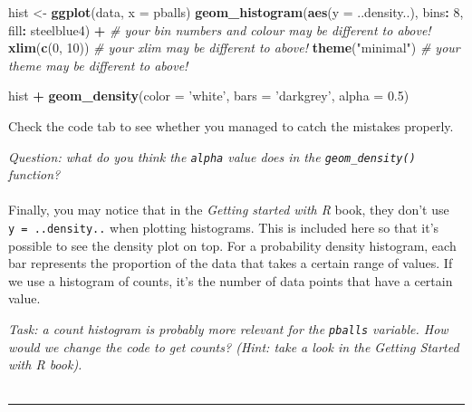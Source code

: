 \documentclass[
]{book}
\newenvironment{Shaded}{\begin{snugshade}}{\end{snugshade}}
\newcommand{\CommentTok}[1]{\textcolor[rgb]{0.56,0.35,0.01}{\textit{#1}}}
\newcommand{\DataTypeTok}[1]{\textcolor[rgb]{0.13,0.29,0.53}{#1}}
\newcommand{\DecValTok}[1]{\textcolor[rgb]{0.00,0.00,0.81}{#1}}
\newcommand{\FloatTok}[1]{\textcolor[rgb]{0.00,0.00,0.81}{#1}}
\newcommand{\KeywordTok}[1]{\textcolor[rgb]{0.13,0.29,0.53}{\textbf{#1}}}
\newcommand{\NormalTok}[1]{#1}
\newcommand{\OperatorTok}[1]{\textcolor[rgb]{0.81,0.36,0.00}{\textbf{#1}}}
\newcommand{\StringTok}[1]{\textcolor[rgb]{0.31,0.60,0.02}{#1}}
\begin{document}
\begin{Shaded}
\begin{Highlighting}[]
\NormalTok{hist <-}\StringTok{ }\KeywordTok{ggplot}\NormalTok{(data, }\DataTypeTok{x =}\NormalTok{ pballs)}
    \KeywordTok{geom_histogram}\NormalTok{(}\KeywordTok{aes}\NormalTok{(}\DataTypeTok{y =}\NormalTok{ ..density..), bins}\OperatorTok{:}\StringTok{ }\DecValTok{8}\NormalTok{, fill}\OperatorTok{:}\StringTok{ }\NormalTok{steelblue4) }\OperatorTok{+}\StringTok{ }
\StringTok{    }\CommentTok{# your bin numbers and colour may be different to above!}
\StringTok{    }\KeywordTok{xlim}\NormalTok{(}\KeywordTok{c}\NormalTok{(}\DecValTok{0}\NormalTok{, }\DecValTok{10}\NormalTok{))}
    \CommentTok{# your xlim may be different to above!}
    \KeywordTok{theme}\NormalTok{(}\StringTok{"minimal"}\NormalTok{)}
    \CommentTok{# your theme may be different to above!}

\NormalTok{hist }\OperatorTok{+}\StringTok{ }\KeywordTok{geom_density}\NormalTok{(}\DataTypeTok{color =} \StringTok{'white'}\NormalTok{, }\DataTypeTok{bars =} \StringTok{'darkgrey'}\NormalTok{, }\DataTypeTok{alpha =} \FloatTok{0.5}\NormalTok{)}
\end{Highlighting}
\end{Shaded}

Check the code tab to see whether you managed to catch the mistakes properly.

\emph{Question: what do you think the \texttt{alpha} value does in the \texttt{geom\_density()}
function?}\\
~\\

Finally, you may notice that in the \emph{Getting started with R} book, they don't
use \texttt{y\ =\ ..density..} when plotting histograms. This is included here so that
it's possible to see the density plot on top. For a probability density histogram,
each bar represents the proportion of the data that takes a certain range of
values. If we use a histogram of counts, it's the number of data points that
have a certain value.

\emph{Task: a count histogram is probably more relevant for the \texttt{pballs} variable.
How would we change the code to get counts? (Hint: take a look in the
Getting Started with R book).}\\
~\\

\begin{center}\rule{0.5\linewidth}{\linethickness}\end{center}
\end{document}
